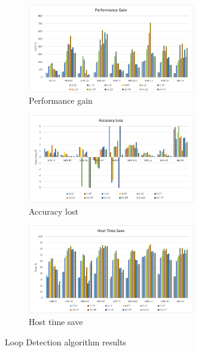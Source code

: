 \begin{figure}[h!]
\centering
\begin{subfigure}{\textwidth}
    \centering
    \includegraphics[width=0.8\textwidth]{Images/Performance_REP.png}
    \caption{ Performance gain}
    \label{fig:Performance_ADAINCPCREP}
\end{subfigure}
\begin{subfigure}{\textwidth}
    \centering
    \includegraphics[width=0.8\textwidth]{Images/Accuracy_REP.png}
    \caption{ Accuracy lost}
    \label{fig:Accuracy_ADAINCPCREP}
\end{subfigure}
\begin{subfigure}{\textwidth}
    \centering
    \includegraphics[width=0.8\textwidth]{Images/Host_REP.png}
    \caption{ Host time save}
    \label{fig:Host_ADAINCPCREP}
\end{subfigure}
        
\caption{Loop Detection algorithm results}
\label{fig:results_ADAINCPCREP}
\end{figure}

